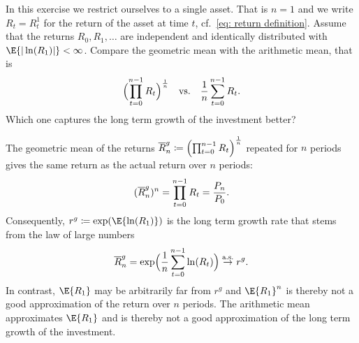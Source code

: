
\begin{exercise}[subtitle={Long term investment returns \Coffeecup}]
    In this exercise we restrict ourselves to a single asset.
    That is \(n=1\) and we write \(R_t = R_t^1\) for the return of the asset at
    time \(t\), cf.~\eqref{eq: return definition}.
    Assume that the returns \(R_0, R_1, \dots\) are independent and identically
    distributed with \(\E{|\ln(R_1)|} < \infty\). Compare the
    geometric mean with the arithmetic mean, that is
    \[
        \Bigl(\prod_{t=0}^{n-1} R_t\Bigr)^\frac1n
        \quad \text{vs.} \quad
        \frac1n\sum_{t=0}^{n-1} R_t.
    \]
    Which one captures the long term growth of the investment better?
\end{exercise}

\begin{solution}
    The geometric mean of the returns \(\overline{R}^g_n \coloneq \Bigl(\prod_{t=0}^{n-1} R_t\Bigr)^\frac1n\)
    repeated for \(n\) periods gives the same return as the actual return over \(n\) periods:
    \[
        (\overline{R}^g_n)^n = \prod_{t=0}^{n-1} R_t = \frac{P_n}{P_0}.
    \]
    Consequently, \(r^g \coloneq \exp(\E{\ln(R_1)})\) is the long term
    growth rate that stems from the law of large numbers
    \[
        \overline{R}^g_n  = \exp\Bigl(\frac1n \sum_{t=0}^{n-1} \ln(R_t)\Bigr) \overset{\operatorname{\text{a.s.}}}\to r^g.
    \]
    In contrast, \(\E{R_1}\) may be arbitrarily far from \(r^g\) and
    \(\E{R_1}^n\) is thereby not a good approximation of the return over \(n\) periods.
    The arithmetic mean approximates \(\E{R_1}\) and is thereby not a good
    approximation of the long term growth of the investment.
\end{solution}

